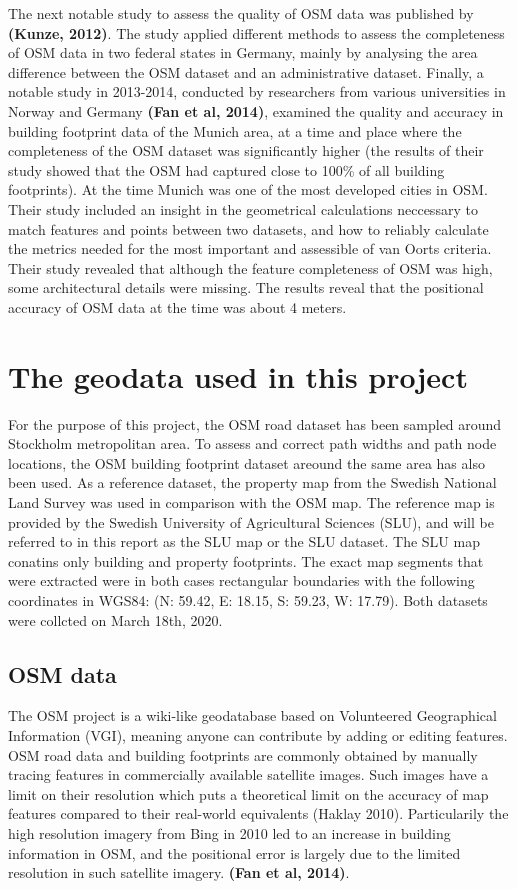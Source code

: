 \documentclass{kththesis}
\begin{document}
The next notable study to assess the quality of OSM data was published by \textbf{(Kunze, 2012)}.
The study applied different methods to assess the completeness of OSM data in two federal states in Germany, mainly by analysing the area difference between the OSM dataset and an administrative dataset.
Finally, a notable study in 2013-2014, conducted by researchers from various universities in Norway and Germany \textbf{(Fan et al, 2014)}, examined the quality and accuracy in building footprint data of the Munich area, at a time and place where the completeness of the OSM dataset was significantly higher (the results of their study showed that the OSM had captured close to 100\% of all building footprints).
At the time Munich was one of the most developed cities in OSM.
Their study included an insight in the geometrical calculations neccessary to match features and points between two datasets, and how to reliably calculate the metrics needed for the most important and assessible of van Oorts criteria.
Their study revealed that although the feature completeness of OSM was high, some architectural details were missing.
The results reveal that the positional accuracy of OSM data at the time was about 4 meters.

\chapter{The geodata used in this project}

For the purpose of this project, the OSM road dataset has been sampled around Stockholm metropolitan area.
To assess and correct path widths and path node locations, the OSM building footprint dataset areound the same area has also been used.
As a reference dataset, the property map from the Swedish National Land Survey was used in comparison with the OSM map.
The reference map is provided by the Swedish University of Agricultural Sciences (SLU), and will be referred to in this report as the SLU map or the SLU dataset.
The SLU map conatins only building and property footprints.
The exact map segments that were extracted were in both cases rectangular boundaries with the following coordinates in WGS84: (N: 59.42, E: 18.15, S: 59.23, W: 17.79).
Both datasets were collcted on March 18th, 2020.

\section{OSM data}

The OSM project is a wiki-like geodatabase based on Volunteered Geographical Information (VGI), meaning anyone can contribute by adding or editing features.
OSM road data and building footprints are commonly obtained by manually tracing features in commercially available satellite images.
Such images have a limit on their resolution which puts a theoretical limit on the accuracy of map features compared to their real-world equivalents (Haklay 2010).
Particularily the high resolution imagery from Bing in 2010 led to an increase in building information in OSM, and the positional error is largely due to the limited resolution in such satellite imagery. \textbf{(Fan et al, 2014)}.
\end{document}
